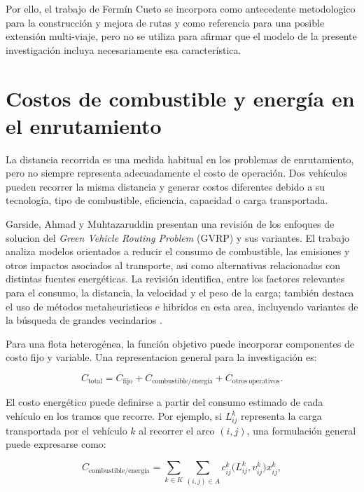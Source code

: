 Por ello, el trabajo de Fermín Cueto se incorpora como antecedente metodologico para la construcción y mejora de rutas y como referencia para una posible extensión multi-viaje, pero no se utiliza para afirmar que el modelo de la presente investigación incluya necesariamente esa característica.

\section{Costos de combustible y energía en el enrutamiento}
\label{sec:costos_energeticos}

La distancia recorrida es una medida habitual en los problemas de enrutamiento, pero no siempre representa adecuadamente el costo de operación. Dos vehículos pueden recorrer la misma distancia y generar costos diferentes debido a su tecnología, tipo de combustible, eficiencia, capacidad o carga transportada.

Garside, Ahmad y Muhtazaruddin presentan una revisión de los enfoques de solucion del \textit{Green Vehicle Routing Problem} (GVRP) y sus variantes. El trabajo analiza modelos orientados a reducir el consumo de combustible, las emisiones y otros impactos asociados al transporte, asi como alternativas relacionadas con distintas fuentes energéticas. La revisión identifica, entre los factores relevantes para el consumo, la distancia, la velocidad y el peso de la carga; también destaca el uso de métodos metaheuristicos e hibridos en esta area, incluyendo variantes de la búsqueda de grandes vecindarios \cite{garside2024}.

Para una flota heterogénea, la función objetivo puede incorporar componentes de costo fijo y variable. Una representacion general para la investigación es:

\begin{equation}
C_{\mathrm{total}}=
C_{\mathrm{fijo}}+C_{\mathrm{combustible/energía}}+C_{\mathrm{otros\ operativos}}.
\label{eq:costo_total}
\end{equation}

El costo energético puede definirse a partir del consumo estimado de cada vehículo en los tramos que recorre. Por ejemplo, si $L_{ij}^{k}$ representa la carga transportada por el vehículo $k$ al recorrer el arco $(i,j)$, una formulación general puede expresarse como:

\begin{equation}
C_{\mathrm{combustible/energía}}=
\sum_{k\in K}\sum_{(i,j)\in A}
 c_{ij}^{k}\bigl(L_{ij}^{k},v_{ij}^{k}\bigr)x_{ij}^{k},
\label{eq:costo_arcos}
\end{equation}

